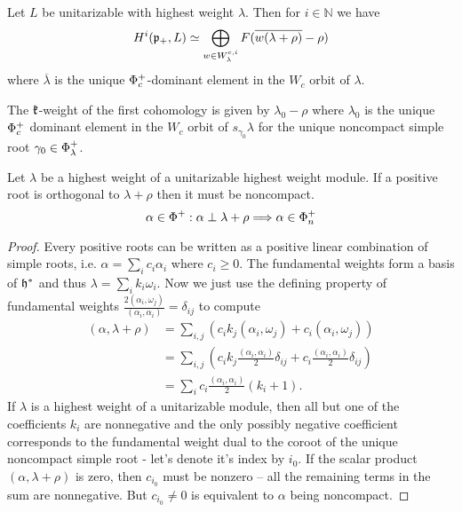 \begin{theorem}\label{thm:cohomology}
 Let $L$ be unitarizable with highest weight $\lambda $. Then for $i\in \mathbb{N}$ we have
\[
 H^i(\mathfrak{p}_+,L)\simeq \bigoplus_{w\in W^{c,i}_\lambda} F(\overline{w(\lambda+\rho)} - \rho)
\]
where  $\overline{\lambda}$ is the unique $\Phi_c^+$-dominant element in the $W_c$ orbit of $\lambda$.
\end{theorem}

\begin{remark}
 The $\mathfrak{k}$-weight of the first cohomology is given by $\lambda_0-\rho$ where $\lambda_0$ is the unique $\Phi_c^+$ dominant element in the $W_c$ orbit of $s_{\gamma_0}\lambda$ for the unique noncompact simple root $\gamma_0 \in \Phi_\lambda^+$.
\end{remark}

\begin{lemma}\label{lem:singular_are_noncompact}
 Let $\lambda$ be a highest weight of a unitarizable highest weight module. If a positive root is orthogonal to $\lambda + \rho$ then it must be noncompact.
 \[
  \alpha \in \Phi^+: \alpha \perp \lambda + \rho \Longrightarrow \alpha \in \Phi^+_n
 \]
\end{lemma}
\begin{proof}
 Every positive roots can be written as a positive linear combination of simple roots, i.e. $\alpha = \sum_i c_i \alpha_i$ where $c_i \geq 0$. The fundamental weights form a basis of $\mathfrak{h}^*$ and thus $\lambda = \sum_i k_i \omega_i$. Now we just use the defining property of fundamental weights $\frac{2(\alpha_i,\omega_j)}{(\alpha_i,\alpha_i)} = \delta_{ij}$ to compute
 \begin{align*}
  (\alpha,\lambda+\rho) & = \sum_{i,j} \left(  c_i k_j (\alpha_i,\omega_j) + c_i (\alpha_i,\omega_j) \right ) \\
			& = \sum_{i,j} \left( c_i k_j \frac{(\alpha_i,\alpha_i)}{2} \delta_{ij} + c_i \frac{(\alpha_i,\alpha_i)}{2} \delta_{ij} \right ) \\
			& = \sum_i c_i \frac{(\alpha_i,\alpha_i)}{2} (k_i + 1).
 \end{align*}
 If $\lambda$ is a highest weight of a unitarizable module, then all but one of the coefficients $k_i$ are nonnegative and the only possibly negative coefficient corresponds to the fundamental weight dual to the coroot of the unique noncompact simple root - let's denote it's index by $i_0$. If the scalar product $(\alpha, \lambda+\rho)$ is zero, then $c_{i_0}$ must be nonzero -- all the remaining terms in the sum are nonnegative. But $c_{i_0} \neq 0$ is equivalent to $\alpha$ being noncompact.
\end{proof}



